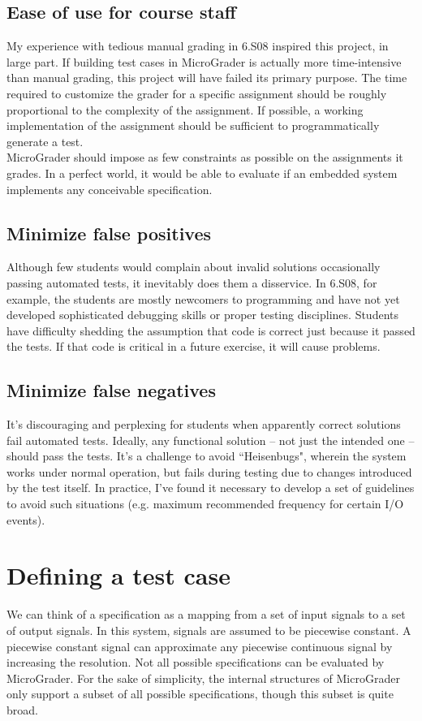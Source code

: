 \documentclass[12pt]{article}
\begin{document}
\subsection{Ease of use for course staff}
\indent \indent My experience with tedious manual grading in 6.S08 inspired this project, in large part.  If building test cases in MicroGrader is actually more time-intensive than manual grading, this project will have failed its primary purpose.  The time required to customize the grader for a specific assignment should be roughly proportional to the complexity of the assignment.  If possible, a working implementation of the assignment should be sufficient to programmatically generate a test.\\
\indent \indent MicroGrader should impose as few constraints as possible on the assignments it grades.  In a perfect world, it would be able to evaluate if an embedded system implements any conceivable specification.

\subsection{Minimize false positives}
\indent \indent Although few students would complain about invalid solutions occasionally passing automated tests, it inevitably does them a disservice.  In 6.S08, for example, the students are mostly newcomers to programming and have not yet developed sophisticated debugging skills or proper testing disciplines.  Students have difficulty shedding the assumption that code is correct just because it passed the tests.  If that code is critical in a future exercise, it will cause problems.

\subsection{Minimize false negatives}
\indent \indent It's discouraging and perplexing for students when apparently correct solutions fail automated tests.  Ideally, any functional solution -- not just the intended one -- should pass the tests.  It's a challenge to avoid ``Heisenbugs", wherein the system works under normal operation, but fails during testing due to changes introduced by the test itself.  In practice, I've found it necessary to develop a set of guidelines to avoid such situations (e.g. maximum recommended frequency for certain I/O events).

\newpage
\section{Defining a test case}
\indent \indent We can think of a specification as a mapping from a set of input signals to a set of output signals.  In this system, signals are assumed to be piecewise constant.  A piecewise constant signal can approximate any piecewise continuous signal by increasing the resolution.  Not all possible specifications can be evaluated by MicroGrader.  For the sake of simplicity, the internal structures of MicroGrader only support a subset of all possible specifications, though this subset is quite broad.
\end{document}
